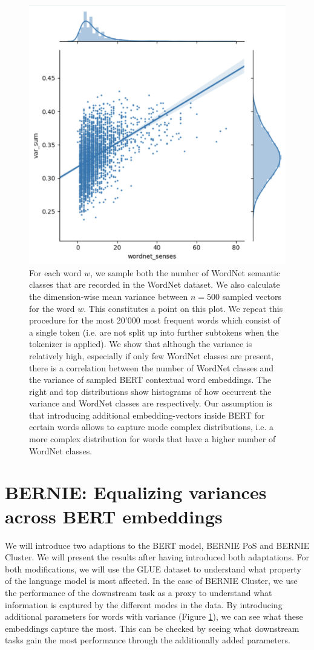 \documentclass[a4paper,12pt,oneside,openright]{report}
\begin{document}
\begin{figure}[H]
	\center
  \includegraphics[width=0.5\linewidth]{./assets/experiments/variance_in_BERT_embeddings.png}
  \caption{
  	For each word $w$, we sample both the number of WordNet semantic classes that are recorded in the WordNet dataset. We also calculate the dimension-wise mean variance between $n=500$ sampled vectors for the word $w$. 
  	This constitutes a point on this plot.
  	We repeat this procedure for the most 20'000 most frequent words which consist of a single token (i.e. are not split up into further subtokens when the tokenizer is applied).
	We show that although the variance is relatively high, especially if only few WordNet classes are present, there is a correlation between the number of WordNet classes and the variance of sampled BERT contextual word embeddings.
	The right and top distributions show histograms of how occurrent the variance and WordNet classes are respectively.
	Our assumption is that introducing additional embedding-vectors inside BERT for certain words allows to capture mode complex distributions, i.e. a more complex distribution for words that have a higher number of WordNet classes.
  }
  \label{fig:BERT_variance}
\end{figure}

\section{BERNIE: Equalizing variances across BERT embeddings}

We will introduce two adaptions to the BERT model, BERNIE PoS and BERNIE Cluster.
We will present the results after having introduced both adaptations.
For both modifications, we will use the GLUE dataset to understand what property of the language model is most affected.
In the case of BERNIE Cluster, we use the performance of the downstream task as a proxy to understand what information is captured by the different modes in the data. 
By introducing additional parameters for words with variance (Figure \ref{fig:BERT_variance}), we can see what these embeddings capture the most.
This can be checked by seeing what downstream tasks gain the most performance through the additionally added parameters.
\end{document}
